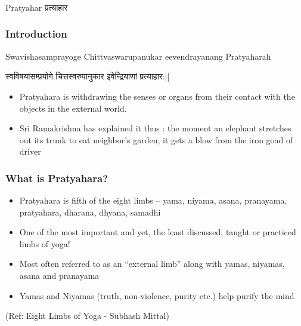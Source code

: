 \begin{frame}[fragile]\frametitle{}
\begin{center}
{\Large Pratyahar प्रत्याहार}
\end{center}
\end{frame}

\begin{frame}[fragile]\frametitle{Introduction}

Swavishasamprayoge Chittvaswarupanukar eevendrayanang Pratyaharah

स्वविषयासम्प्रयोगे चित्तस्वरुपानुकार इवेन्द्रियाणां प्रत्याहार:||

	\begin{itemize}
	\item Pratyahara  is  withdrawing 
the  senses  or  organs  from 
their  contact  with  the 
objects  in  the  external 
world.  
	\item Sri  Ramakrishna  has 
explained  it  thus  :  the 
moment  an  elephant 
stretches out its trunk to eat 
neighbor’s  garden,  it  gets  a 
blow  from  the  iron  goad  of 
driver 
	\end{itemize}

\end{frame}


\begin{frame}[fragile]\frametitle{What is Pratyahara?}


	\begin{itemize}
	\item Pratyahara is fifth of the eight limbs – yama, 
niyama, asana, pranayama, pratyahara, 
dharana, dhyana, samadhi
	\item One of the most important and yet, the least 
discussed, taught or practiced limbs of yoga!
	\item Most often referred to as an “external limb” 
along with yamas, niyamas, asana and 
pranayama
	\item Yamas and Niyamas (truth, non-violence, 
purity etc.) help purify the mind
	\end{itemize}

\tiny{(Ref: Eight Limbs of Yoga - Subhash Mittal)}

\end{frame}

